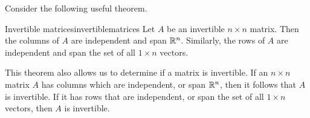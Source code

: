 Consider the following useful theorem.

\begin{theorem}{Invertible matrices}{invertiblematrices}
Let $A$ be an invertible $n \times n$ matrix. Then the columns of $A$ are independent and span $\mathbb{R}^n$. Similarly, the rows of $A$ are independent and span the set of all $1 \times n$ vectors. 
\end{theorem}

This theorem also allows us to determine if a matrix is invertible. If an $n \times n$ matrix $A$ has columns which are independent, or span $\mathbb{R}^n$, then it follows that $A$ is invertible. If it has rows that are independent, or span the set of all $1 \times n$ vectors, then $A$ is invertible.
